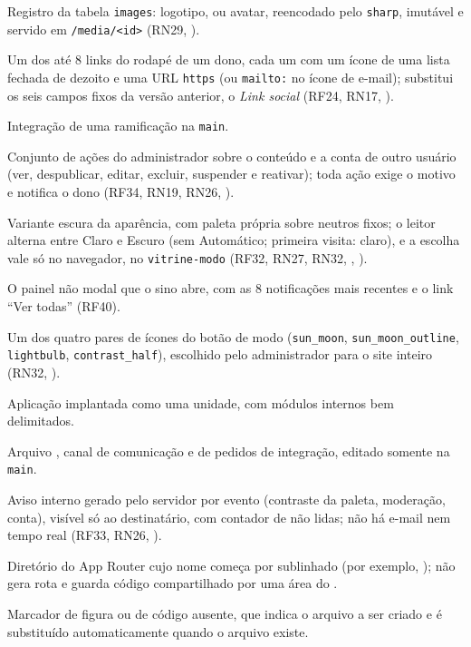 \begin{description}[style=nextline, leftmargin=0.6cm, itemsep=4pt]
  \item[Imagem] Registro da tabela \texttt{images}: logotipo,  ou avatar, reencodado pelo \texttt{sharp}, imutável e servido em \texttt{/media/<id>} (RN29, ).
  \item[Link do rodapé] Um dos até 8 links do rodapé de um dono, cada um com um ícone de uma lista fechada de dezoito e uma URL \texttt{https} (ou \texttt{mailto:} no ícone de e-mail); substitui os seis campos fixos da versão anterior, o \emph{Link social} (RF24, RN17, ).
  \item[Merge] Integração de uma ramificação na \texttt{main}.
  \item[Moderação] Conjunto de ações do administrador sobre o conteúdo e a conta de outro usuário (ver, despublicar, editar, excluir, suspender e reativar); toda ação exige o motivo e notifica o dono (RF34, RN19, RN26, ).
  \item[Modo noturno] Variante escura da aparência, com paleta própria sobre neutros fixos; o leitor alterna entre Claro e Escuro (sem Automático; primeira visita: claro), e a escolha vale só no navegador, no  \texttt{vitrine-modo} (RF32, RN27, RN32, , ).
  \item[Painel suspenso] O painel não modal que o sino abre, com as 8 notificações mais recentes e o link ``Ver todas'' (RF40).
  \item[Par de ícones] Um dos quatro pares de ícones do botão de modo (\texttt{sun\_moon}, \texttt{sun\_moon\_outline}, \texttt{lightbulb}, \texttt{contrast\_half}), escolhido pelo administrador para o site inteiro (RN32, ).
  \item[Monólito modular] Aplicação implantada como uma unidade, com módulos internos bem delimitados.
  \item[Mural] Arquivo , canal de comunicação e de pedidos de integração, editado somente na \texttt{main}.
  \item[Notificação] Aviso interno gerado pelo servidor por evento (contraste da paleta, moderação, conta), visível só ao destinatário, com contador de não lidas; não há e-mail nem tempo real (RF33, RN26, ).
  \item[Pasta privada] Diretório do App Router cujo nome começa por sublinhado (por exemplo, ); não gera rota e guarda código compartilhado por uma área do .
  \item[Placeholder] Marcador de figura ou de código ausente, que indica o arquivo a ser criado e é substituído automaticamente quando o arquivo existe.

\end{description}
